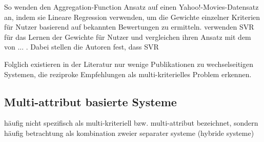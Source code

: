 So wenden \textcite[S. 48ff.]{adomavicius:inproceedings:2} den Aggregation-Function Ansatz auf einen Yahoo!-Movies-Datensatz an, indem sie Lineare Regression verwenden, um die Gewichte einzelner Kriterien für Nutzer basierend auf bekannten Bewertungen zu ermitteln.
\textcite[S. 678]{jannach:2:article} verwenden \ac{SVR} für das Lernen der Gewichte für Nutzer und vergleichen ihren Ansatz mit dem von ... .
Dabei stellen die Autoren fest, dass \ac{SVR}

Folglich existieren in der Literatur nur wenige Publikationen zu wechselseitigen Systemen, die reziproke Empfehlungen als multi-kriterielles Problem erkennen.


\subsection{Multi-attribut basierte Systeme}
häufig nicht spezifisch als multi-kriteriell bzw. multi-attribut bezeichnet, sondern häufig betrachtung als kombination zweier separater systeme (hybride systeme) %


